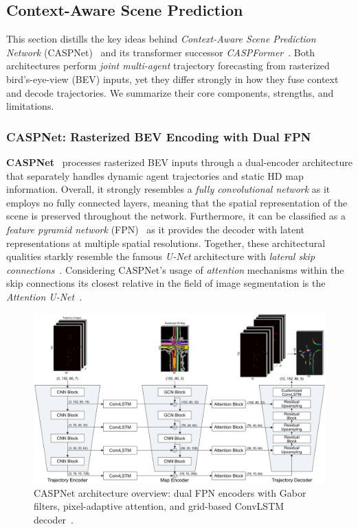 \subsection{Context-Aware Scene Prediction}
\label{ssec:caspnet}

This section distills the key ideas behind \emph{Context-Aware Scene Prediction Network} (CASPNet)~\cite{caspnetSchäfer2022} and its transformer successor \emph{CASPFormer}~\cite{caspformerYadav2024}. Both architectures perform \emph{joint multi-agent} trajectory forecasting from rasterized bird's-eye-view (BEV) inputs, yet they differ strongly in how they fuse context and decode trajectories. We summarize their core components, strengths, and limitations.

\subsubsection*{CASPNet: Rasterized BEV Encoding with Dual FPN}

\textbf{CASPNet}~\cite{caspnetSchäfer2022} processes rasterized BEV inputs through a dual-encoder architecture that separately handles dynamic agent trajectories and static HD map information. Overall, it strongly resembles a \emph{fully convolutional network} as it employs no fully connected layers, meaning that the spatial representation of the scene is preserved throughout the network. Furthermore, it can be classified as a \emph{feature pyramid network} (FPN)~\cite{FPNLin2017} as it provides the decoder with latent representations at multiple spatial resolutions. Together, these architectural qualities starkly resemble the famous \emph{U-Net} architecture with \emph{lateral skip connections}~\cite{UNetLSRonneberger2015}. Considering CASPNet's usage of \emph{attention} mechanisms within the skip connections its closest relative in the field of image segmentation is the \emph{Attention U-Net}~\cite{UNetAttnOktay2018}.

\begin{figure}[ht]
  \centering
  \includegraphics[width=\linewidth]{figures/caspnet_arch.png}
  \caption{CASPNet architecture overview: dual FPN encoders with Gabor filters, pixel-adaptive attention, and grid-based ConvLSTM decoder~\cite{caspnetSchäfer2022}.}
  \label{fig:caspnet_overview}
\end{figure}

